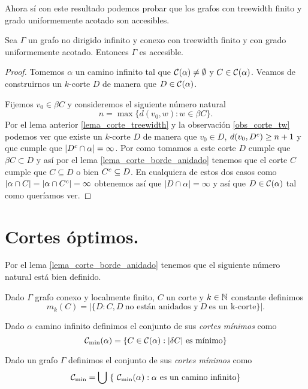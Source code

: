 \documentclass[tesis.tex]{subfiles}
\begin{document}
Ahora sí con este resultado podemos probar que los grafos con treewidth finito y grado uniformemente acotado son accesibles.

\begin{teo}\label{teo_treewidth_fin_accesible}
	Sea $\Gamma$ un grafo no dirigido infinito y conexo con treewidth finito y con grado uniformemente acotado.
	Entonces $\Gamma$ es accesible.
\end{teo}
\begin{proof}
	Tomemos $\alpha$ un camino infinito tal que ${\cal C}(\alpha) \neq \emptyset$ y $C \in {\cal C}(\alpha)$.
	Veamos de construirnos un $k$-corte $D$ de manera que $D \in {\cal C}(\alpha)$.
	
	Fijemos $v_0  \in \beta C$ y consideremos el siguiente número natural
	\[
	n = \max \{ d(v_0,w) : w \in \beta C  \}.
	\]
	Por el lema anterior \ref{lema_corte_treewidth} y la observación \ref{obs_corte_tw} podemos ver que existe un $k$-corte $D$ de manera que $v_{0} \in D$, $d(v_0, D^{c}) \ge n+1$ y que cumple que $|D^{c} \cap \alpha| = \infty$.
	Por como tomamos a este corte $D$ cumple que $\beta C \subset D$ y así por el lema \ref{lema_corte_borde_anidado} tenemos que el corte $C$ cumple que 
	$C \subseteq D$ o bien $C^{c} \subseteq D$.
	En cualquiera de estos dos casos como $|\alpha \cap C| = |\alpha \cap C^{c}| = \infty$ obtenemos así que $|D \cap \alpha|=\infty$ y así que $D \in {\cal C}(\alpha)$ tal como queríamos ver. 
	
\end{proof}


\section{Cortes óptimos.}\label{secc_copt}

Por el lema \ref{lema_corte_borde_anidado} tenemos que el siguiente número natural está bien definido.

\begin{deff}
	Dado $\Gamma$ grafo conexo y localmente finito, $C$ un corte y $k \in \mathbb{N}$ constante definimos
	\[
	m_k(C) = | \{  D : C, D \ \text{no están anidados y} \ D \ \text{es un k-corte}   \} |. 
	\]
\end{deff}

\begin{deff}
	Dado $\alpha$ camino infinito definimos el conjunto de sus \emph{cortes mínimos} como
	\[
	\cam = \{  C \in \ca : |\delta C| \ \text{es mínimo}  \}
	\]
	
	Dado un grafo $\Gamma$ definimos el conjunto de sus \emph{cortes mínimos} como 
	\[
	{\cal C}_{\text{min}} = \bigcup \ \{ \ {\cal C}_{\text{min}}(\alpha) : \alpha \ \text{es un camino infinito}  \}
	\]
\end{deff}
\end{document}
